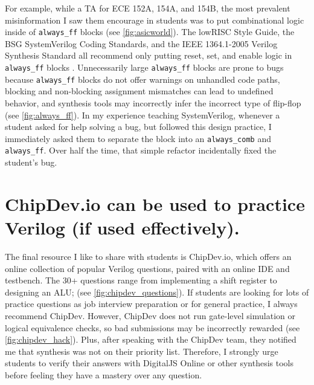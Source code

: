 


For example, while a TA for ECE 152A, 154A, and 154B, the most prevalent misinformation I saw them encourage in students was to put combinational logic inside of \texttt{always_ff} blocks (see \autoref{fig:asicworld}). The lowRISC Style Guide, the BSG SystemVerilog Coding Standards, and the IEEE 1364.1-2005 Verilog Synthesis Standard all recommend only putting reset, set, and enable logic in \texttt{always_ff} blocks \cite{lowRISCstyleguides, BSGstyleguide, 1364.1-2005}. Unnecessarily large \texttt{always_ff} blocks are prone to bugs because \texttt{always_ff} blocks do not offer warnings on unhandled code paths, blocking and non-blocking assignment mismatches can lead to undefined behavior, and synthesis tools may incorrectly infer the incorrect type of flip-flop (see \autoref{fig:always_ff}). In my experience teaching SystemVerilog, whenever a student asked for help solving a bug, but followed this design practice, I immediately asked them to separate the block into an \texttt{always_comb} and \texttt{always_ff}. Over half the time, that simple refactor incidentally fixed the student's bug.

\FloatBarrier

\section{ChipDev.io can be used to practice Verilog (if used effectively).}




The final resource I like to share with students is ChipDev.io, which offers an online collection of popular Verilog questions, paired with an online IDE and testbench. The 30+ questions range from implementing a shift register to designing an ALU; (see \autoref{fig:chipdev_questions}). If students are looking for lots of practice questions as job interview preparation or for general practice, I always recommend ChipDev. However, ChipDev does not run gate-level simulation or logical equivalence checks, so bad submissions may be incorrectly rewarded (see \autoref{fig:chipdev_hack}). Plus, after speaking with the ChipDev team, they notified me that synthesis was not on their priority list. Therefore, I strongly urge students to verify their answers with DigitalJS Online or other synthesis tools before feeling they have a mastery over any question.
